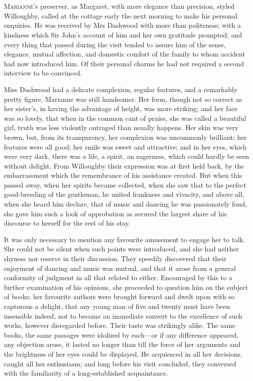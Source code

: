 \chapter[Chapter \thechapter]{}
\lettrine[lraise=0.3]{M}{arianne}'s preserver, as Margaret, with more elegance than precision, styled Willoughby, called at the cottage early the next morning to make his personal enquiries. He was received by Mrs Dashwood with more than politeness; with a kindness which Sir John's account of him and her own gratitude prompted; and every thing that passed during the visit tended to assure him of the sense, elegance, mutual affection, and domestic comfort of the family to whom accident had now introduced him. Of their personal charms he had not required a second interview to be convinced.

Miss Dashwood had a delicate complexion, regular features, and a remarkably pretty figure. Marianne was still handsomer. Her form, though not so correct as her sister's, in having the advantage of height, was more striking; and her face was so lovely, that when in the common cant of praise, she was called a beautiful girl, truth was less violently outraged than usually happens. Her skin was very brown, but, from its transparency, her complexion was uncommonly brilliant; her features were all good; her smile was sweet and attractive; and in her eyes, which were very dark, there was a life, a spirit, an eagerness, which could hardly be seen without delight. From Willoughby their expression was at first held back, by the embarrassment which the remembrance of his assistance created. But when this passed away, when her spirits became collected, when she saw that to the perfect good-breeding of the gentleman, he united frankness and vivacity, and above all, when she heard him declare, that of music and dancing he was passionately fond, she gave him such a look of approbation as secured the largest share of his discourse to herself for the rest of his stay.

It was only necessary to mention any favourite amusement to engage her to talk. She could not be silent when such points were introduced, and she had neither shyness nor reserve in their discussion. They speedily discovered that their enjoyment of dancing and music was mutual, and that it arose from a general conformity of judgment in all that related to either. Encouraged by this to a further examination of his opinions, she proceeded to question him on the subject of books; her favourite authors were brought forward and dwelt upon with so rapturous a delight, that any young man of five and twenty must have been insensible indeed, not to become an immediate convert to the excellence of such works, however disregarded before. Their taste was strikingly alike. The same books, the same passages were idolized by each—or if any difference appeared, any objection arose, it lasted no longer than till the force of her arguments and the brightness of her eyes could be displayed. He acquiesced in all her decisions, caught all her enthusiasm; and long before his visit concluded, they conversed with the familiarity of a long-established acquaintance.

